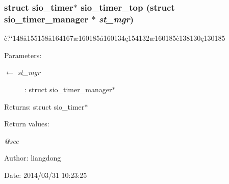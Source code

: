 \subsubsection{\setlength{\rightskip}{0pt plus 5cm}struct sio\_\-timer$\ast$ sio\_\-timer\_\-top (struct sio\_\-timer\_\-manager $\ast$ {\em st\_\-mgr})}\label{sio__timer_8c_a12}


\`{e}?`148\aa{}155158\aa{}164167\ae{}160185\aa{}160134\c{c}154132\ae{}160185\`{e}138130\c{c}130185 

\begin{Desc}
\item[Parameters:]
\begin{description}
\item[\mbox{$\leftarrow$} {\em st\_\-mgr}]: struct sio\_\-timer\_\-manager$\ast$ \end{description}
\end{Desc}
\begin{Desc}
\item[Returns:]struct sio\_\-timer$\ast$ \end{Desc}
\begin{Desc}
\item[Return values:]
\begin{description}
\item[{\em @see}]\end{description}
\end{Desc}
\begin{Desc}
\item[Author:]liangdong \end{Desc}
\begin{Desc}
\item[Date:]2014/03/31 10:23:25 \end{Desc}
